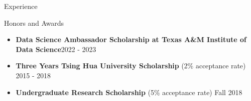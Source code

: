 \documentclass{resume}
\begin{document}
\begin{rSection}{Experience}
\end{rSection}


\vspace{-0.25em}
\begin{rSection}{Honors and Awards}
    \begin{itemize}
        \item \textbf{Data Science Ambassador Scholarship at Texas A\&M Institute of Data Science}\hfill 2022 - 2023
        \item \textbf{Three Years Tsing Hua University Scholarship} (2\% acceptance rate) \hfill 2015 - 2018
        \item \textbf{Undergraduate Research Scholarship} (5\% acceptance rate) \hfill Fall 2018
    \end{itemize}
\end{rSection}
\end{document}
